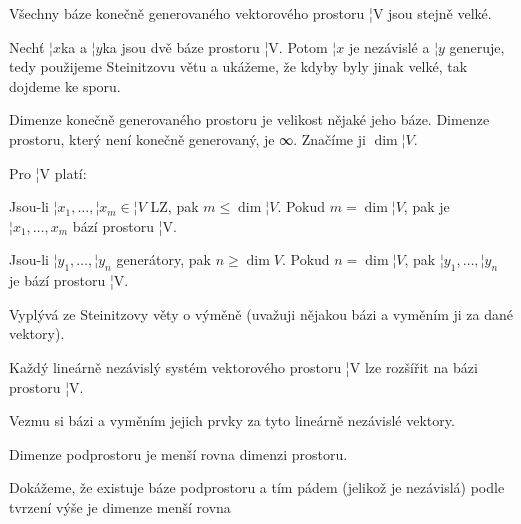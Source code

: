 \documentclass[12pt]{article}					%
\begin{document}
    \begin{dusledek}
        Všechny báze konečně generovaného vektorového prostoru ¦V jsou stejně velké.

        \begin{dukazin}
            Nechť $¦x$ka a $¦y$ka jsou dvě báze prostoru ¦V. Potom $¦x$ je nezávislé a $¦y$ generuje, tedy použijeme Steinitzovu větu a ukážeme, že kdyby byly jinak velké, tak dojdeme ke sporu.
        \end{dukazin}
    \end{dusledek}

    \begin{definice}[Dimenze]
        Dimenze konečně generovaného prostoru je velikost nějaké jeho báze. Dimenze prostoru, který není konečně generovaný, je ∞. Značíme ji $\dim ¦V$.
    \end{definice}

    \begin{tvrzeni}
        Pro ¦V platí:

        Jsou-li $¦x_1, …, ¦x_m \in ¦V$ LZ, pak $m ≤ \dim ¦V$. Pokud $m = \dim ¦V$, pak je $¦x_1, …, x_m$ bází prostoru ¦V.

        Jsou-li $¦y_1, …, ¦y_n$ generátory, pak $n ≥ \dim V$. Pokud $n = \dim ¦V$, pak $¦y_1, …, ¦y_n$ je bází prostoru ¦V.

        \begin{dukazin}
            Vyplývá ze Steinitzovy věty o výměně (uvažuji nějakou bázi a vyměním ji za dané vektory).
        \end{dukazin}
    \end{tvrzeni}

    \begin{veta}
        Každý lineárně nezávislý systém vektorového prostoru ¦V lze rozšířit na bázi prostoru ¦V.

        \begin{dukazin}
            Vezmu si bázi a vyměním jejich prvky za tyto lineárně nezávislé vektory.
        \end{dukazin}
    \end{veta}

    \begin{veta}
        Dimenze podprostoru je menší rovna dimenzi prostoru.

        \begin{dukazin}
            Dokážeme, že existuje báze podprostoru a tím pádem (jelikož je nezávislá) podle tvrzení výše je dimenze menší rovna 
        \end{dukazin}
    \end{veta}
\end{document}
